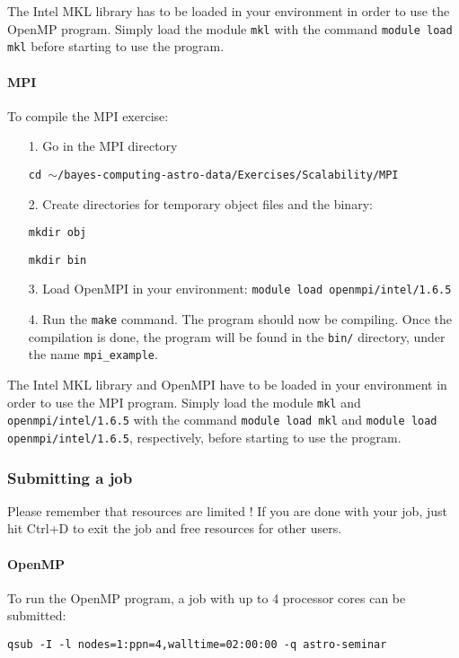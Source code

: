 \documentclass[letterpaper,10pt]{article}
\begin{document}
The Intel MKL library has to be loaded in your environment in order to use the OpenMP program. Simply load the module \texttt{mkl} with the command \texttt{module load mkl} before starting to use the program. 

\paragraph{MPI} To compile the MPI exercise:
\begin{itemize}
 \item[1.] Go in the MPI directory 
\begin{center}
 \texttt{cd $\sim$/bayes-computing-astro-data/Exercises/Scalability/MPI}
\end{center}
 \item[2.] Create directories for temporary object files and the binary:
\begin{center}
 \texttt{mkdir obj}
\end{center}
\begin{center}
 \texttt{mkdir bin}
\end{center} 
\item[3.] Load OpenMPI in your environment: \texttt{module load openmpi/intel/1.6.5} 
 
\item[4.] Run the \texttt{make} command. The program should now be compiling. Once the compilation is done, the program will be found in the \texttt{bin/} directory, under the name \texttt{mpi\_example}.
\end{itemize}

The Intel MKL library and OpenMPI have to be loaded in your environment in order to use the MPI program. Simply load the module \texttt{mkl} and \texttt{openmpi/intel/1.6.5} with the command \texttt{module load mkl} and 
\texttt{module load openmpi/intel/1.6.5}, respectively, before starting to use the program. 


\subsubsection{Submitting a job}
Please remember that resources are limited ! If you are done with your job, just hit Ctrl+D to exit the job and free resources for other users.

\paragraph{OpenMP} To run the OpenMP program, a job with up to 4 processor cores can be submitted:
\begin{center}
 \texttt{qsub -I -l nodes=1:ppn=4,walltime=02:00:00 -q astro-seminar}
\end{center}
\end{document}
